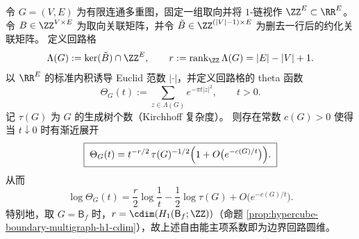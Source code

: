 \begin{theorem}\label{thm:hypercube-cycle-lattice-theta-asymptotic}
令 \(G=(V,E)\) 为有限连通多重图，固定一组取向并将 \(1\)-链视作 \(\ZZ^{E}\subset\RR^{E}\)。
令 \(B\in\ZZ^{V\times E}\) 为取向关联矩阵，并令 \(\tilde B\in\ZZ^{(|V|-1)\times E}\) 为删去一行后的约化关联矩阵。
定义回路格
\[
\Lambda(G):=\ker(\tilde B)\cap\ZZ^{E},
\qquad
r:=\operatorname{rank}_{\ZZ}\Lambda(G)=|E|-|V|+1.
\]
以 \(\RR^{E}\) 的标准内积诱导 Euclid 范数 \(|\cdot|\)，并定义回路格的 theta 函数
\[
\Theta_G(t):=\sum_{z\in\Lambda(G)}e^{-\pi t|z|^2},
\qquad t>0.
\]
记 \(\tau(G)\) 为 \(G\) 的生成树个数（Kirchhoff 复杂度）。
则存在常数 \(c(G)>0\) 使得当 \(t\downarrow 0\) 时有渐近展开
\[
\boxed{\;
\Theta_G(t)=t^{-r/2}\,\tau(G)^{-1/2}\Bigl(1+O\bigl(e^{-c(G)/t}\bigr)\Bigr).
\;}
\]
从而
\[
\boxed{\;
\log\Theta_G(t)=\frac r2\log\frac1t-\frac12\log\tau(G)+O\bigl(e^{-c(G)/t}\bigr).
\;}
\]
特别地，取 \(G=\mathsf B_f\) 时，\(r=\cdim(H_1(\mathsf B_f;\ZZ))\)（命题 \ref{prop:hypercube-boundary-multigraph-h1-cdim}），故上述自由能主项系数即为边界回路圆维。
\end{theorem}

